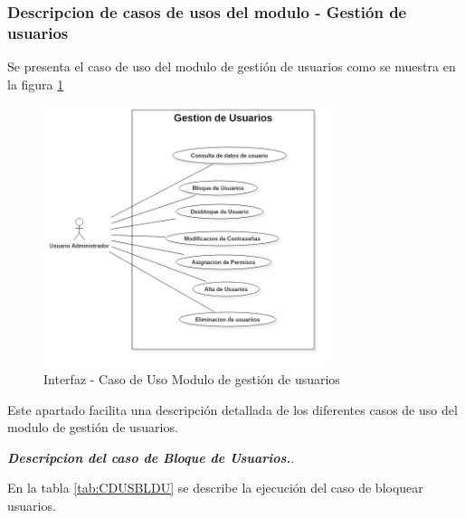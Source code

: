 \subsubsection{Descripcion de casos de usos del modulo - Gestión de usuarios }
Se presenta el caso de uso del modulo de gestión de usuarios como se muestra en la figura \ref{fig:DDCDUGDUSER}

\begin{figure}[H]
	\centering
	\includegraphics[width=0.75\textwidth]{Capitulo4/Img/GestionUser/Gestion_User}
	\caption{Interfaz - Caso de Uso Modulo de gestión de usuarios}
	\label{fig:DDCDUGDUSER}
\end{figure}

Este apartado facilita una descripción detallada de los diferentes casos de uso del modulo de gestión de usuarios.

\textbf{\textit{Descripcion del caso de Bloque de Usuarios.}}.

En la tabla \ref{tab:CDUSBLDU} se describe la ejecución del caso de bloquear usuarios.

